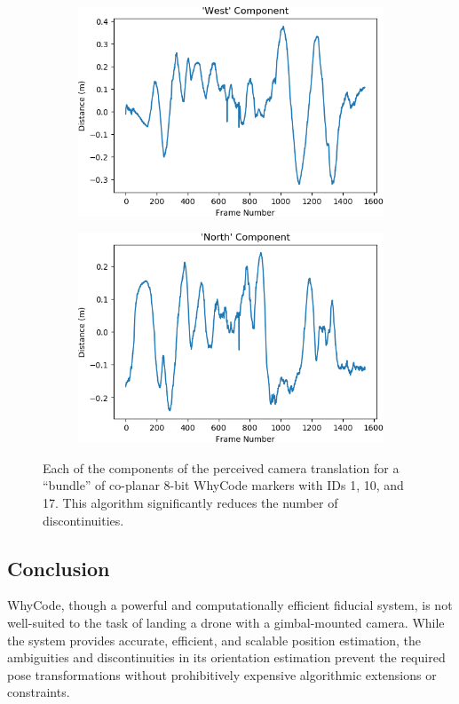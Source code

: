 \begin{figure}
    \begin{subfigure}[b]{0.49\textwidth}
         \centering
         \includegraphics[width=\textwidth]{images/bundles.csv_figure_w}
    \end{subfigure}
    \hfill
    \begin{subfigure}[b]{0.49\textwidth}
         \centering
         \includegraphics[width=\textwidth]{images/bundles.csv_figure_n}
    \end{subfigure}

    \caption{Each of the components of the perceived camera translation for a ``bundle'' of co-planar 8-bit WhyCode markers with IDs 1, 10, and 17.
    This algorithm significantly reduces the number of discontinuities.}
    \label{figure:plane_uwn}
\end{figure}

\subsection{Conclusion}

WhyCode, though a powerful and computationally efficient fiducial system, is not well-suited to the task of landing a drone with a gimbal-mounted camera.
While the system provides accurate, efficient, and scalable position estimation, the ambiguities and discontinuities in its orientation estimation
prevent the required pose transformations without prohibitively expensive algorithmic extensions or constraints.